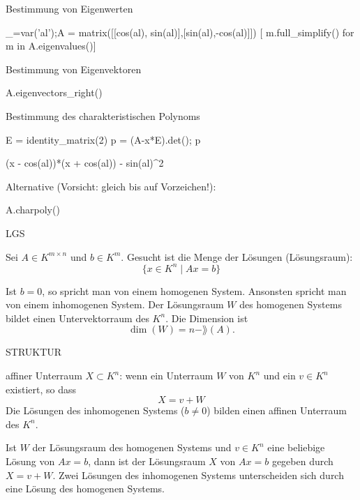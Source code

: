\documentclass[fontsize=12pt,paper=a4,twoside,bibtotoc,idxtotoc,
liststotoc,pagesize,BCOR1.2cm,DIV15,chapterprefix,pagesize=pdftex]{scrbook}
\theoremstyle{plain}
\theoremstyle{definition}
\theoremstyle{remark}
\begin{document}
 Bestimmung von Eigenwerten
\begin{sagein}
_=var('al');A = matrix([[cos(al), sin(al)],[sin(al),-cos(al)]])
[ m.full_simplify() for m in  A.eigenvalues()]
\end{sagein}
\begin{sage}
  [-1, 1]
\end{sage}
 Bestimmung von Eigenvektoren
\begin{sagein}
A.eigenvectors_right()
\end{sagein}
  Bestimmung des charakteristischen Polynoms
\begin{sagein}
E = identity_matrix(2)
p = (A-x*E).det(); p
\end{sagein}
\begin{sage}
(x - cos(al))*(x + cos(al)) - sin(al)^2
\end{sage}
Alternative (Vorsicht: gleich bis auf Vorzeichen!):
\begin{sagein}
A.charpoly() 
\end{sagein}

\begin{sagein}
[m.full_simplify() for m in solve(p==0,x)]
\end{sagein}
\begin{sage}
  [x == -1, x == 1]
\end{sage}


LGS

Sei $A\in K^{m \times n}$ und $b \in K^m$. Gesucht ist die Menge der
Lösungen (Lösungsraum): 
\[ \{ x \in K^n \;|\; A x = b\} \]

 Ist $b=0$, so spricht man von einem {\color{red} homogenen
System}. Ansonsten spricht man von einem {\color{red} inhomogenen System}.
 Der Lösungsraum $W$ des homogenen Systems bildet einen
Untervektorraum des $K^n$. Die Dimension ist 
\[ \dim (W)=n - \rang(A). \] 


STRUKTUR


 {\color{red} affiner Unterraum}  $X \subset K^n$: wenn ein
Unterraum $W$ von $K^n$ und ein $v \in K^n$ existiert, so dass 
\[X=v+W\]
 Die Lösungen des inhomogenen Systems ($b \neq 0$) bilden einen affinen
Unterraum des $K^n$.   

 Ist $W$ der Lösungsraum des homogenen Systems und $v \in K^n$
eine beliebige Lösung von $Ax=b$, dann ist der Lösungsraum $X$ von $Ax=b$
gegeben durch  $X=v+W$.
 Zwei Lösungen des inhomogenen Systems unterscheiden sich durch
eine Lösung des homogenen Systems.
\end{document}
